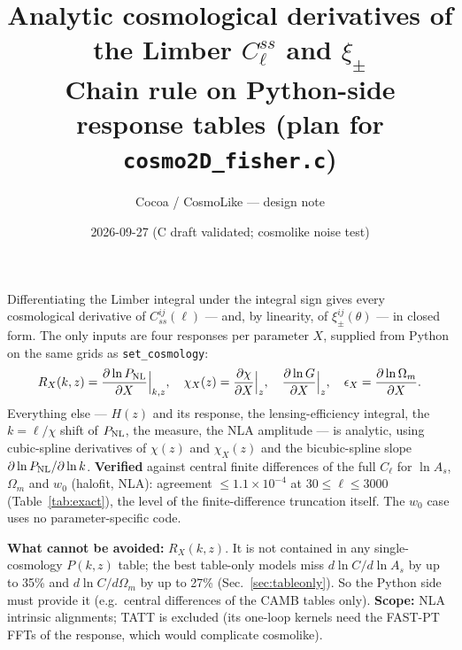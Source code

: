 \documentclass[11pt]{article}
\title{Analytic cosmological derivatives of the Limber $C_\ell^{ss}$ and $\xi_\pm$\\
\large Chain rule on Python-side response tables (plan for \texttt{cosmo2D\_fisher.c})}
\author{Cocoa / CosmoLike --- design note}
\date{2026-09-27 (C draft validated; cosmolike noise test)}
\begin{document}
\sloppy
\maketitle

\begin{tcolorbox}[colback=gray!6,colframe=gray!50,title=Summary]
Differentiating the Limber integral under the integral sign gives every
cosmological derivative of $C^{ij}_{ss}(\ell)$ --- and, by linearity, of
$\xi_\pm^{ij}(\theta)$ --- in closed form. The only inputs are four responses
per parameter $X$, supplied from Python on the same grids as
\texttt{set\_cosmology}:
\[
R_X(k,z)=\frac{\partial\ln P_{\rm NL}}{\partial X}\Big|_{k,z},\quad
\chi_X(z)=\frac{\partial\chi}{\partial X}\Big|_{z},\quad
\frac{\partial \ln G}{\partial X}\Big|_{z},\quad
\epsilon_X=\frac{\partial\ln\Omega_m}{\partial X}.
\]
Everything else --- $H(z)$ and its response, the lensing-efficiency
integral, the $k=\ell/\chi$ shift of $P_{\rm NL}$, the measure, the NLA
amplitude --- is analytic, using cubic-spline derivatives of $\chi(z)$ and
$\chi_X(z)$ and the bicubic-spline slope $\partial\ln P_{\rm NL}/\partial\ln k$.
\textbf{Verified} against central finite differences of the full $C_\ell$
for $\ln A_s$, $\Omega_m$ and $w_0$ (halofit, NLA): agreement
$\le 1.1\times10^{-4}$ at $30\le\ell\le3000$ (Table~\ref{tab:exact}), the
level of the finite-difference truncation itself. The $w_0$ case uses no
parameter-specific code.

\textbf{What cannot be avoided:} $R_X(k,z)$. It is not contained in any
single-cosmology $P(k,z)$ table; the best table-only models miss
$d\ln C/d\ln A_s$ by up to 35\% and $d\ln C/d\Omega_m$ by up to 27\%
(Sec.~\ref{sec:tableonly}). So the Python side must provide it (e.g.\
central differences of the CAMB tables only). \textbf{Scope:} NLA
intrinsic alignments; TATT is excluded (its one-loop kernels need the
FAST-PT FFTs of the response, which would complicate cosmolike).
\end{tcolorbox}
\end{document}
